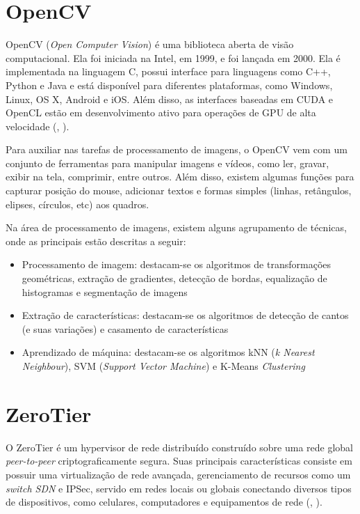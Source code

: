 \documentclass[]{politex}
\begin{document}
\section{OpenCV}
OpenCV (\textit{Open Computer Vision}) é uma biblioteca aberta de visão computacional. Ela foi iniciada na Intel, em 1999, e foi lançada em 2000. Ela é implementada na linguagem C, possui interface para linguagens como C++, Python e Java e está disponível para diferentes plataformas, como Windows, Linux, OS X, Android e iOS. Além disso, as interfaces baseadas em CUDA e OpenCL estão em desenvolvimento ativo para operações de GPU de alta velocidade (, \citeyear{opencvtutorials}).

Para auxiliar nas tarefas de processamento de imagens, o OpenCV vem com um conjunto de ferramentas para manipular imagens e vídeos, como ler, gravar, exibir na tela, comprimir, entre outros. Além disso, existem algumas funções para capturar posição do mouse, adicionar textos e formas simples (linhas, retângulos, elipses, círculos, etc) aos quadros.

Na área de processamento de imagens, existem alguns agrupamento de técnicas, onde as principais estão descritas a seguir:
\begin{itemize}
    \item Processamento de imagem: destacam-se os algoritmos de transformações geométricas, extração de gradientes, detecção de bordas, equalização de histogramas e segmentação de imagens
    \item Extração de características: destacam-se os algoritmos de detecção de cantos (e suas variações) e casamento de características
    \item Aprendizado de máquina: destacam-se os algoritmos kNN (\textit{k Nearest Neighbour}), SVM (\textit{Support Vector Machine}) e K-Means \textit{Clustering}
\end{itemize}

\section{ZeroTier}
O ZeroTier é um hypervisor de rede distribuído construído sobre uma rede global \textit{peer-to-peer} criptograficamente segura. Suas principais características consiste em possuir uma virtualização de rede avançada, gerenciamento de recursos como um \textit{switch SDN} e IPSec, servido em redes locais ou globais conectando diversos tipos de dispositivos, como celulares, computadores e equipamentos de rede (, \citeyear{zerotier}).
\end{document}

